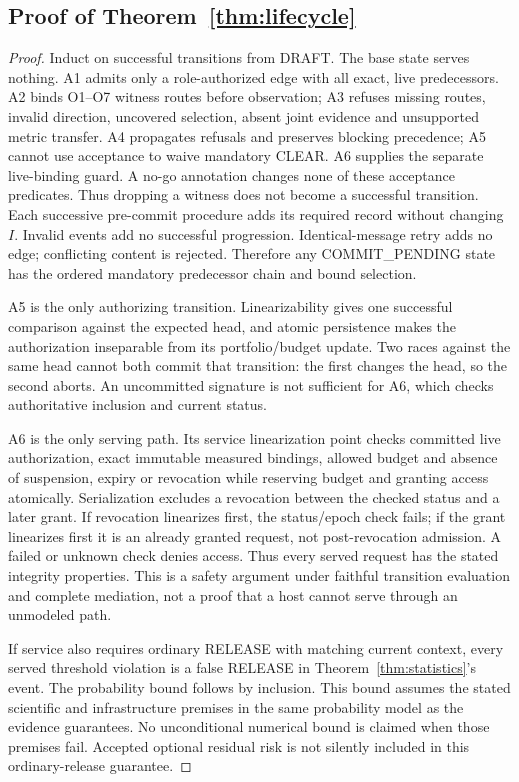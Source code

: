 \subsection{Proof of Theorem~\ref{thm:lifecycle}}
\begin{proof}
Induct on successful transitions from DRAFT. The base state serves nothing.
A1 admits only a role-authorized edge with all exact, live predecessors.
A2 binds O1--O7 witness routes before observation; A3 refuses missing routes,
invalid direction, uncovered selection, absent joint evidence and unsupported
metric transfer. A4 propagates refusals and preserves blocking precedence;
A5 cannot use acceptance to waive mandatory CLEAR. A6 supplies the separate
live-binding guard. A no-go annotation changes none of these acceptance
predicates. Thus dropping a witness does not become a successful transition.
Each successive pre-commit procedure adds its required record without changing
$I$. Invalid events add no successful progression. Identical-message retry
adds no edge; conflicting content is rejected. Therefore any COMMIT\_PENDING
state has the ordered mandatory predecessor chain and bound selection.

A5 is the only authorizing transition. Linearizability gives one successful
comparison against the expected head, and atomic persistence makes the
authorization inseparable from its portfolio/budget update. Two races against
the same head cannot both commit that transition: the first changes the head,
so the second aborts. An uncommitted signature is not sufficient for A6,
which checks authoritative inclusion and current status.

A6 is the only serving path. Its service linearization point checks committed
live authorization, exact immutable measured bindings, allowed budget and
absence of suspension, expiry or revocation while reserving budget and granting
access atomically. Serialization excludes a revocation between the checked
status and a later grant. If revocation linearizes first, the status/epoch
check fails; if the grant linearizes first it is an already granted request,
not post-revocation admission. A failed or unknown check denies access. Thus
every served request has the stated integrity properties. This is a safety
argument under faithful transition evaluation and complete mediation, not a
proof that a host cannot serve through an unmodeled path.

If service also requires ordinary RELEASE with matching current context, every
served threshold violation is a false RELEASE in
Theorem~\ref{thm:statistics}'s event. The probability bound follows by inclusion.
This bound assumes the stated scientific and infrastructure premises in the
same probability model as the evidence guarantees. No unconditional numerical
bound is claimed when those premises fail. Accepted optional residual risk is not
silently included in this ordinary-release guarantee.


\end{proof}
